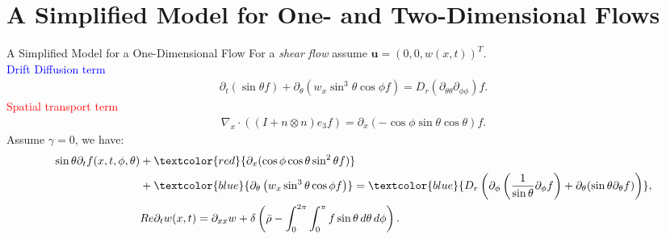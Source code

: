 \section{A Simplified Model for One- and Two-Dimensional Flows}
\begin{frame}{A Simplified Model for a One-Dimensional Flow}
	\scriptsize
	For a \textit{shear flow} assume $	\boldsymbol{u} = (0,0,w(x,t))^T$. \\
	\vspace{5mm}
	\textcolor{blue}{Drift Diffusion term} 
	\begin{align*}
		\partial_{t}\left(\sin \theta f\right)+ \partial_\theta\left(w_x \sin ^3 \theta \cos \phi f\right)
		=D_{r}(\partial_{\theta\theta}\partial_{\phi\phi})f.
	\end{align*}
	\textcolor{red}{Spatial transport term}
	\begin{align*}
		\nabla_x \cdot ((I+n \otimes n)e_3f) =\partial_x( -\cos\phi \sin\theta \cos\theta)f.
	\end{align*}
 Assume $\gamma = 0$, we have:
\begin{equation}
	\begin{aligned}
		\sin\theta \partial_{t}f(x,t,\phi,\theta) & + \textcolor{red}{\partial_x (\cos\phi \cos\theta \sin^2\theta f)} \\
		& + \textcolor{blue}{\partial_\theta \left(w_x \sin^3 \theta \cos \phi f\right)}
		= \textcolor{blue}{D_{r} \left( \partial_\phi \left(\frac{1}{\sin \theta} \partial_\phi f \right) + \partial_\theta (\sin \theta \partial_\theta f) \right)}, \\
		& Re \partial_{t}w(x,t) = \partial_{xx}w + \delta \left( \bar{\rho} - \int_{0}^{2\pi} \int_{0}^{\pi} f \sin \theta \, d\theta \, d\phi \right). \label{SmochEq_wx}
	\end{aligned}
\end{equation}
\end{frame}


